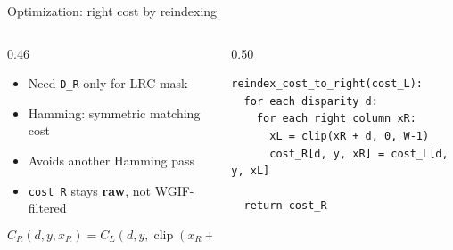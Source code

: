\documentclass[aspectratio=169,11pt]{beamer}
\newcommand{\code}[1]{\texttt{#1}}
\begin{document}
\begin{frame}[fragile]{Optimization: right cost by reindexing}
\begin{columns}[T,totalwidth=\textwidth]
\begin{column}{0.46\textwidth}
\begin{itemize}
    \item Need \code{D\_R} only for LRC mask
    \item Hamming: symmetric matching cost
    \item Avoids another Hamming pass
    \item \code{cost\_R} stays \textbf{raw}, not WGIF-filtered
\end{itemize}
\vspace{0.3em}
\[
C_R(d,y,x_R)=C_L(d,y,\operatorname{clip}(x_R+d))
\]
\end{column}
\begin{column}{0.50\textwidth}
\scriptsize
\begin{verbatim}
reindex_cost_to_right(cost_L):
  for each disparity d:
    for each right column xR:
      xL = clip(xR + d, 0, W-1)
      cost_R[d, y, xR] = cost_L[d, y, xL]

  return cost_R
\end{verbatim}
\end{column}
\end{columns}
\end{frame}


\end{document}
